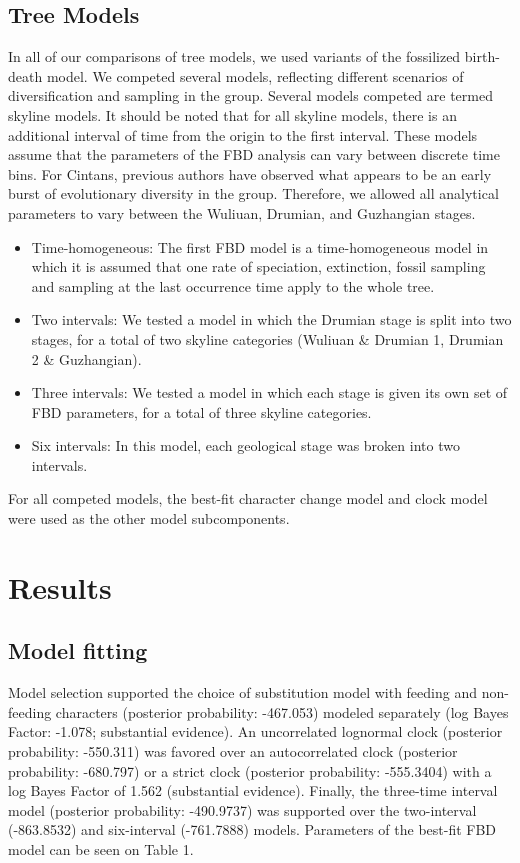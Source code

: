 \documentclass{article}
\begin{document}
\subsection{Tree Models}

In all of our comparisons of tree models, we used variants of the fossilized birth-death model. 
We competed several models, reflecting different scenarios of diversification and sampling in the group.
Several models competed are termed skyline models.
It should be noted that for all skyline models, there is an additional interval of time from the origin to the first interval.
These models assume that the parameters of the FBD analysis can vary between discrete time bins.
For Cintans, previous authors have observed what appears to be an early burst of evolutionary diversity in the group.
Therefore, we allowed all analytical parameters to vary between the Wuliuan, Drumian, and Guzhangian stages.

\begin{itemize}
\item Time-homogeneous: The first FBD model is a time-homogeneous model in which it is assumed that one rate of speciation, extinction, fossil sampling and sampling at the last occurrence time apply to the whole tree. 
\item Two intervals: We tested a model in which the Drumian stage is split into two stages, for a total of two skyline categories (Wuliuan \& Drumian 1, Drumian 2 \& Guzhangian).
\item Three intervals: We tested a model in which each stage is given its own set of FBD parameters, for a total of three skyline categories.
\item Six intervals: In this model, each geological stage was broken into two intervals.
\end{itemize}
For all competed models, the best-fit character change model and clock model were used as the other model subcomponents.

\section{Results}

\subsection{Model fitting}

Model selection supported the choice of substitution model with feeding and non-feeding characters (posterior probability: -467.053) modeled separately (log Bayes Factor: -1.078; substantial evidence).
An uncorrelated lognormal clock (posterior probability: -550.311) was favored over an autocorrelated clock (posterior probability: -680.797) or a strict clock (posterior probability: -555.3404) with a log Bayes Factor of 1.562 (substantial evidence).
Finally, the three-time interval model (posterior probability: -490.9737) was supported over the two-interval (-863.8532) and six-interval (-761.7888) models. 
Parameters of the best-fit FBD model can be seen on Table 1.
\end{document}
